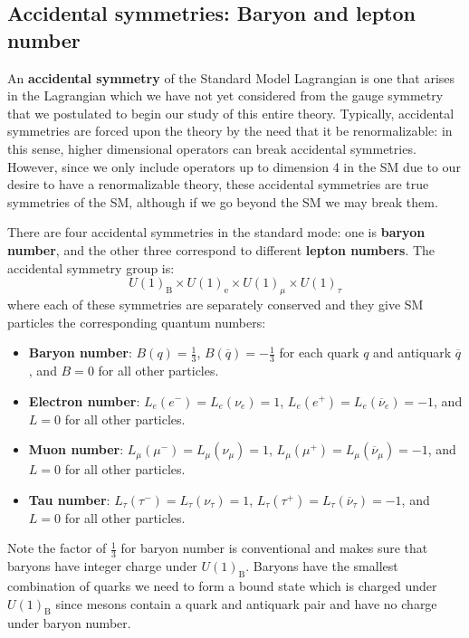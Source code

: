 \documentclass[11pt, oneside]{article}   	%
\theoremstyle{definition}
\numberwithin{equation}{subsection}		%
\begin{document}



\subsection{Accidental symmetries: Baryon and lepton number}
\label{subsec:accidental_sym}

An \textbf{accidental symmetry} of the Standard Model Lagrangian is one that arises in the Lagrangian which we have not yet considered from the 
gauge symmetry that we postulated to begin our study of this entire theory. Typically, accidental symmetries are forced upon the theory by the 
need that it be renormalizable: in this sense, higher dimensional operators can break accidental symmetries. However, since we only include operators 
up to dimension 4 in the SM due to our desire to have a renormalizable theory, these accidental symmetries are true symmetries of the SM, 
although if we go beyond the SM we may break them. 

There are four accidental symmetries in the standard mode: one is \textbf{baryon number}, and the other three correspond to different 
\textbf{lepton numbers}. The accidental symmetry group is:
\begin{equation}
	U(1)_\mathrm{B}\times U(1)_\mathrm{e}\times U(1)_\mu\times U(1)_\tau
\end{equation}
where each of these symmetries are separately conserved and they give SM particles the corresponding quantum numbers:
\begin{itemize}
	\item \textbf{Baryon number}: $B(q) = \frac{1}{3}$, $B(\overline q) = -\frac{1}{3}$ for each quark $q$ and antiquark $\overline q$, and 
	$B = 0$ for all other particles.
	\item \textbf{Electron number}: $L_e(e^-) = L_e(\nu_e) = 1$, $L_e(e^+) = L_e(\overline\nu_e) = -1$, and $L = 0$ for all other particles. 
	\item \textbf{Muon number}: $L_\mu(\mu^-) = L_\mu(\nu_\mu) = 1$, $L_\mu(\mu^+) = L_\mu(\overline\nu_\mu) = -1$, and $L = 0$ for all other particles. 
	\item \textbf{Tau number}: $L_\tau(\tau^-) = L_\tau(\nu_\tau) = 1$, $L_\tau(\tau^+) = L_\tau(\overline\nu_\tau) = -1$, and $L = 0$ for all other particles. 
\end{itemize}
Note the factor of $\frac{1}{3}$ for baryon number is conventional and makes sure that baryons have integer charge under $U(1)_\mathrm{B}$. Baryons 
have the smallest combination of quarks we need to form a bound state which is charged under $U(1)_\mathrm{B}$ since mesons contain a quark and 
antiquark pair and have no charge under baryon number.
\end{document}
